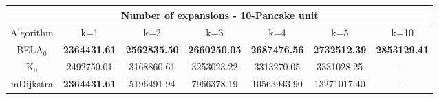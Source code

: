 \begin{tabular}{c|cccccc}\toprule
\multicolumn{7}{c}{Number of expansions - 10-Pancake unit}\\ \midrule
Algorithm & k=1 & k=2 & k=3 & k=4 & k=5 & k=10 \\ \midrule
BELA$_0$ & \textbf{2364431.61} & \textbf{2562835.50} & \textbf{2660250.05} & \textbf{2687476.56} & \textbf{2732512.39} & \textbf{2853129.41} \\
K$_0$ & 2492750.01 & 3168860.61 & 3253023.22 & 3313270.05 & 3331028.25 & -- \\
mDijkstra & \textbf{2364431.61} & 5196491.94 & 7966378.19 & 10563943.90 & 13271017.40 & -- \\ \bottomrule 
\end{tabular}
